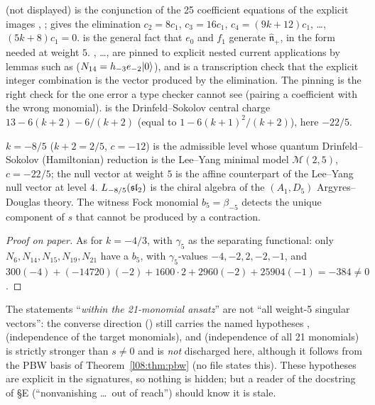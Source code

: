\begin{dictionary}
 (not displayed) is the conjunction of the 25 coefficient equations of the explicit
images , ;  gives the elimination
$c_2 = 8c_1$, $c_3=16c_1$, $c_4 = (9k+12)c_1$, \ldots, $(5k+8)c_1 = 0$.  is the general
fact that $e_0$ and $f_1$ generate $\widehat{\mathfrak n}_+$, in the form needed at weight $5$.
, \ldots,  are pinned to explicit nested current applications by  lemmas such
as  ($N_{14} = h_{-3}e_{-2}|0\rangle$), and  is a 
transcription check that the explicit integer combination is the vector produced by the elimination.
The  pinning is the right check for the one error a type checker cannot see (pairing a
coefficient with the wrong monomial). \allowbreak{} is the Drinfeld--Sokolov central
charge $13-6(k+2)-6/(k+2)$ (equal to $1-6(k+1)^2/(k+2)$), here $-22/5$.
\end{dictionary}

\begin{physics}
$k=-8/5$ ($k+2 = 2/5$, $c=-12$) is the admissible level whose quantum Drinfeld--Sokolov (Hamiltonian)
reduction is the Lee--Yang minimal model $\mathcal M(2,5)$, $c=-22/5$; the null vector at weight $5$ is the
affine counterpart of the Lee--Yang null vector at level $4$. $L_{-8/5}(\mathfrak{sl}_2)$ is the chiral algebra of
the $(A_1,D_5)$ Argyres--Douglas theory. The witness Fock monomial $b_5 = \beta_{-5}$ detects the unique
component of $s$ that cannot be produced by a contraction.
\end{physics}

\begin{proof}[Proof on paper]
As for $k=-4/3$, with $\gamma_5$ as the separating functional: only $N_6, N_{14}, N_{15}, N_{19}, N_{21}$ have a
$b_5$, with $\gamma_5$-values $-4,-2,2,-2,-1$, and
$300(-4)+(-14720)(-2)+1600\cdot2+2960(-2)+25904(-1) = -384\ne0$.
\end{proof}

\begin{warning}[title={What remains conditional at $k=-8/5$}]
The statements ``\emph{within the 21-monomial ansatz}'' are not ``all weight-5 singular vectors'':
the converse direction (\allowbreak{}\allowbreak{}\allowbreak{}) still carries the named hypotheses
,  (independence of the target monomials), and  (independence of
all 21 monomials) is strictly stronger than $s\ne0$ and is \emph{not} discharged here, although it
follows from the PBW basis of Theorem~\ref{l08:thm:pbw} (no file states this). These hypotheses are
explicit in the signatures, so nothing is hidden; but a reader of the docstring of
 \S E (``nonvanishing \ldots\ out of reach'') should know it is stale.
\end{warning}

